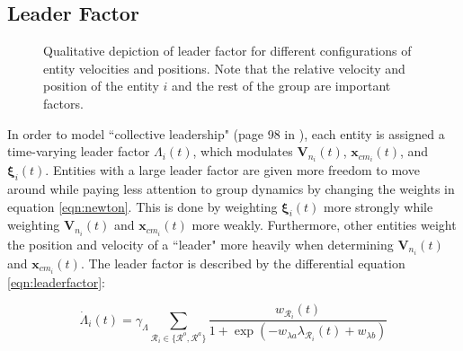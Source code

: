 \documentclass[conference]{IEEEtran}
\begin{document}
\subsection{Leader Factor}

\begin{figure}[htbp]
    \centering
    \quad
    \quad
    \par
    \quad
    \caption{Qualitative depiction of leader factor for different configurations of entity velocities and positions. Note that the relative velocity and position of the entity $i$ and the rest of the group are important factors.}
\end{figure}

In order to model ``collective leadership" (page 98 in \cite{Vicsek}), each entity is assigned a time-varying leader factor $\Lambda_i(t)$, which modulates $\mathbf{V}_{n_i}(t)$, $\mathbf{x}_{cm_i}(t)$, and $\bm{\xi}_i(t)$.
Entities with a large leader factor are given more freedom to move around while paying less attention to group dynamics by changing the weights in equation \ref{eqn:newton}.
This is done by weighting $\bm{\xi}_i(t)$ more strongly while weighting $\mathbf{V}_{n_i}(t)$ and $\mathbf{x}_{cm_i}(t)$ more weakly.
Furthermore, other entities weight the position and velocity of a ``leader" more heavily when determining $\mathbf{V}_{n_i}(t)$ and $\mathbf{x}_{cm_i}(t)$.
The leader factor is described by the differential equation \ref{eqn:leaderfactor}:

\begin{equation}
    \dot{\Lambda}_i(t) = \gamma_{\Lambda}\sum_{\mathcal{R}_i\in\{\mathcal{R}^o,\mathcal{R}^a\}} \frac{w_{\mathcal{R}_i}(t)}{1+\exp\left(-w_{\lambda a}\lambda_{\mathcal{R}_i}(t)+w_{\lambda b}\right)}
    \label{eqn:leaderfactor}
\end{equation}
\end{document}
